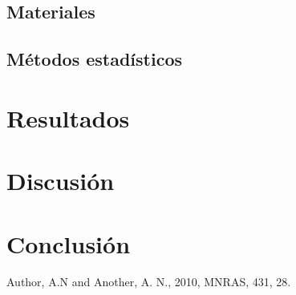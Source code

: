 \documentclass[letterpaper,11pt]{article}
\begin{document}
\subsection{Materiales}

\subsection{Métodos estadísticos}


\section{Resultados}

\section{Discusión}

\section{Conclusión}


\begin{thebibliography}{99}

Author, A.N and Another, A. N., 2010, MNRAS, 431, 28.

\end{thebibliography}
\end{document}
